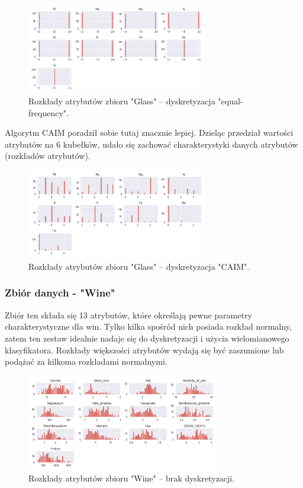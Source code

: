     \begin{figure}[H]
        \center
        \includegraphics[width=0.7\textwidth]{img/discretization/ef_glass.png}
        \caption{Rozkłady atrybutów zbioru "Glass" -- dyskretyzacja "equal-frequency".}
    \end{figure}

    Algorytm CAIM poradził sobie tutaj znacznie lepiej. Dzieląc przedział wartości
    atrybutów na 6 kubełków, udało się zachować charakterystyki danych atrybutów (rozkładów atrybutów).

    \begin{figure}[H]
        \center
        \includegraphics[width=0.7\textwidth]{img/discretization/caim_glass.png}
        \caption{Rozkłady atrybutów zbioru "Glass" -- dyskretyzacja "CAIM".}
    \end{figure}
    
\pagebreak
\subsubsection{Zbiór danych - "Wine"}
    Zbiór ten składa się 13 atrybutów, które określają pewne parametry
    charakterystyczne dla win. Tylko kilka spośród nich posiada rozkład normalny,
    zatem ten zestaw idealnie nadaje się do dyskretyzacji i użycia wielomianowego
    klasyfikatora. Rozkłady większości atrybutów wydają się być zaszumione lub podążać
    za kilkoma rozkładami normalnymi.

    \begin{figure}[H]
        \center
        \includegraphics[width=0.75\textwidth]{img/discretization/non_discretized_wine.png}
        \caption{Rozkłady atrybutów zbioru "Wine" -- brak dyskretyzacji.}
    \end{figure}

